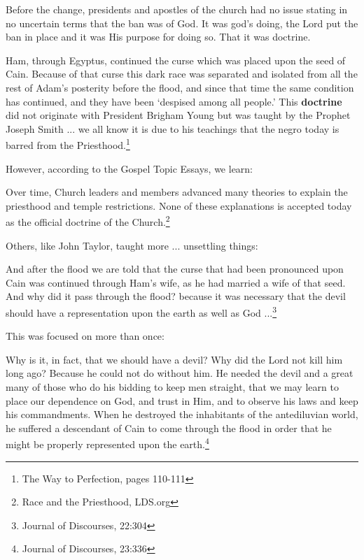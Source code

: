 \documentclass{article}
\begin{document}
Before the change, presidents and apostles of the church had no issue stating in 
no uncertain terms that the ban was of God. It was god's doing, the Lord put the 
ban in place and it was His purpose for doing so. That it was doctrine.

\begin{displayquote}
Ham, through Egyptus, continued the curse which was placed upon the seed of 
Cain. Because of that curse this dark race was separated and isolated from all 
the rest of Adam's posterity before the flood, and since that time the same 
condition has continued, and they have been `despised among all people.' 
This \textbf{doctrine} did not originate with President Brigham Young but was 
taught by the Prophet Joseph Smith ... we all know it is due to his teachings 
that the negro today is barred from the 
Priesthood.\footnote{The Way to Perfection, pages 110-111}
\end{displayquote}

However, according to the Gospel Topic Essays, we learn:

\begin{displayquote}
Over time, Church leaders and members advanced many theories to explain the 
priesthood and temple restrictions. None of these explanations is accepted 
today as the official doctrine of the 
Church.\footnote{Race and the Priesthood, LDS.org}
\end{displayquote}

Others, like John Taylor, taught more ... unsettling things:

\begin{displayquote}
And after the flood we are told that the curse that had been pronounced upon 
Cain was continued through Ham's wife, as he had married a wife of that seed. 
And why did it pass through the flood? because it was necessary that the devil 
should have a representation upon the earth as well as 
God ...\footnote{Journal of Discourses, 22:304}
\end{displayquote}

This was focused on more than once:

\begin{displayquote}
Why is it, in fact, that we should have a devil? Why did the Lord not kill 
him long ago? Because he could not do without him. He needed the devil and a 
great many of those who do his bidding to keep men straight, that we may learn 
to place our dependence on God, and trust in Him, and to observe his laws and 
keep his commandments. When he destroyed the inhabitants of the antediluvian 
world, he suffered a descendant of Cain to come through the flood in order 
that he might be properly represented upon the 
earth.\footnote{Journal of Discourses, 23:336}
\end{displayquote}
\end{document}
